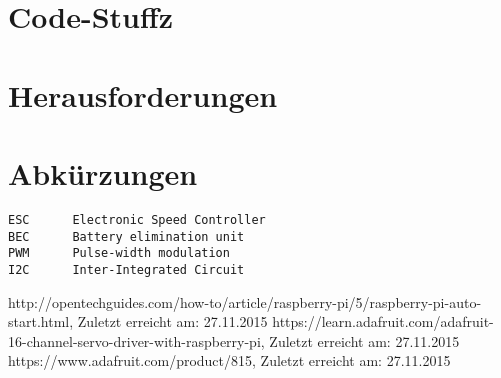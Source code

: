 \documentclass[a4paper,10pt]{scrartcl}
\begin{document}
\section{Code-Stuffz}

\section{Herausforderungen}

\section{Abkürzungen}
  \begin{lstlisting}
ESC      Electronic Speed Controller
BEC      Battery elimination unit
PWM      Pulse-width modulation
I2C      Inter-Integrated Circuit
  \end{lstlisting}

\begin{thebibliography}{9}
    http://opentechguides.com/how-to/article/raspberry-pi/5/raspberry-pi-auto-start.html,
    Zuletzt erreicht am: 27.11.2015
    https://learn.adafruit.com/adafruit-16-channel-servo-driver-with-raspberry-pi,
    Zuletzt erreicht am: 27.11.2015
    https://www.adafruit.com/product/815,
    Zuletzt erreicht am: 27.11.2015
\end{thebibliography}
\end{document}
